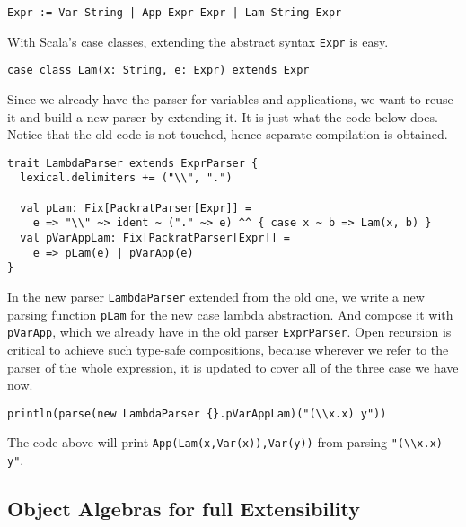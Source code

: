 \begin{lstlisting}[language=PlainCode]
Expr := Var String | App Expr Expr | Lam String Expr
\end{lstlisting}

With Scala's case classes, extending the abstract syntax \lstinline{Expr} is easy.

\begin{lstlisting}
case class Lam(x: String, e: Expr) extends Expr
\end{lstlisting}

Since we already have the parser for variables and applications, we
want to reuse it and build a new parser by extending it. It is just
what the code below does. Notice that the old code is not touched,
hence separate compilation is obtained.

\begin{lstlisting}
trait LambdaParser extends ExprParser {
  lexical.delimiters += ("\\", ".")

  val pLam: Fix[PackratParser[Expr]] =
    e => "\\" ~> ident ~ ("." ~> e) ^^ { case x ~ b => Lam(x, b) }
  val pVarAppLam: Fix[PackratParser[Expr]] =
    e => pLam(e) | pVarApp(e)
}
\end{lstlisting}

In the new parser \lstinline{LambdaParser} extended from the old one,
we write a new parsing function \lstinline{pLam} for the new case
lambda abstraction. And compose it with \lstinline{pVarApp}, which we
already have in the old parser \lstinline{ExprParser}. Open recursion
is critical to achieve such type-safe compositions, because wherever
we refer to the parser of the whole expression, it is updated to cover
all of the three case we have now.

\begin{lstlisting}
println(parse(new LambdaParser {}.pVarAppLam)("(\\x.x) y"))
\end{lstlisting}

The code above will print \lstinline{App(Lam(x,Var(x)),Var(y))} from parsing \lstinline{"(\\x.x)} \lstinline{y"}.

\subsection{Object Algebras for full Extensibility}\label{subsec:overview-oa}


